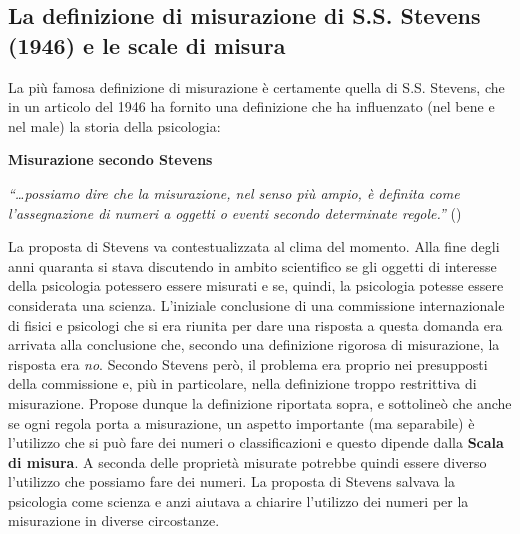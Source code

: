 \documentclass[
  italian,
  letterpaper,
  paper=6in:9in,
  pagesize=pdftex,
  headinclude=on,
  footinclude=on,
  11pt]{scrbook}
\begin{document}
\subsection{La definizione di misurazione di S.S. Stevens (1946) e le
scale di
misura}\label{la-definizione-di-misurazione-di-s.s.-stevens-1946-e-le-scale-di-misura}

La più famosa definizione di misurazione è certamente quella di S.S.
Stevens, che in un articolo del 1946 ha fornito una definizione che ha
influenzato (nel bene e nel male) la storia della psicologia:

\begin{tcolorbox}[enhanced jigsaw, title=\textcolor{quarto-callout-note-color}{\faInfo}\hspace{0.5em}{Definizione}, coltitle=black, bottomtitle=1mm, colback=white, bottomrule=.15mm, rightrule=.15mm, breakable, toptitle=1mm, left=2mm, colbacktitle=quarto-callout-note-color!10!white, titlerule=0mm, colframe=quarto-callout-note-color-frame, leftrule=.75mm, opacitybacktitle=0.6, arc=.35mm, toprule=.15mm, opacityback=0]

\textbf{Misurazione secondo Stevens}

\emph{``\ldots possiamo dire che la misurazione, nel senso più ampio, è
definita come l'assegnazione di numeri a oggetti o eventi secondo
determinate regole.''} (\cite[p.~667]{stevens1946measurement})

\end{tcolorbox}

La proposta di Stevens va contestualizzata al clima del momento. Alla
fine degli anni quaranta si stava discutendo in ambito scientifico se
gli oggetti di interesse della psicologia potessero essere misurati e
se, quindi, la psicologia potesse essere considerata una scienza.
L'iniziale conclusione di una commissione internazionale di fisici e
psicologi che si era riunita per dare una risposta a questa domanda era
arrivata alla conclusione che, secondo una definizione rigorosa di
misurazione, la risposta era \emph{no}. Secondo Stevens però, il
problema era proprio nei presupposti della commissione e, più in
particolare, nella definizione troppo restrittiva di misurazione.
Propose dunque la definizione riportata sopra, e sottolineò che anche se
ogni regola porta a misurazione, un aspetto importante (ma separabile) è
l'utilizzo che si può fare dei numeri o classificazioni e questo dipende
dalla \textbf{Scala di misura}. A seconda delle proprietà misurate
potrebbe quindi essere diverso l'utilizzo che possiamo fare dei numeri.
La proposta di Stevens salvava la psicologia come scienza e anzi aiutava
a chiarire l'utilizzo dei numeri per la misurazione in diverse
circostanze.
\end{document}
